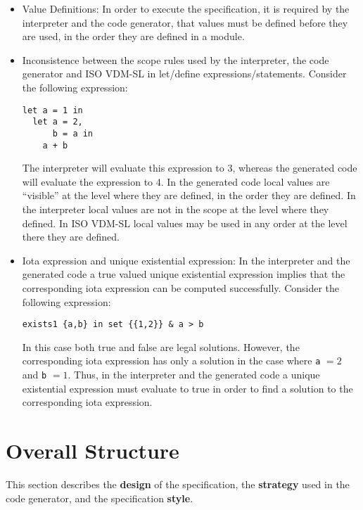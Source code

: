 \documentclass[a4paper,dvips]{article}
\begin{document}
\begin{itemize}
\item Value Definitions: In order to execute the specification, it is
  required by the interpreter and the code generator, that values must
  be defined before they are used, in the order they are defined in a
  module.

\item Inconsistence between the scope rules used by the interpreter,
  the code generator and ISO VDM-SL in let/define
  expressions/statements. Consider the following expression:

  \begin{verbatim}
let a = 1 in
  let a = 2,
      b = a in
    a + b
  \end{verbatim}

  The interpreter will evaluate this expression to 3, whereas the
  generated code will evaluate the expression to 4. In the
  generated code local values are ``visible'' at the level where they
  are defined, in the order they are defined. In the interpreter local
  values are not in the scope at the level where they defined. In ISO
  VDM-SL local values may be used in any order at the level there they
  are defined.

\item Iota expression and unique existential expression: In the
  interpreter and the generated code a true valued unique existential
  expression implies that the corresponding iota expression can be
  computed successfully. Consider the following expression:

  \begin{verbatim}
exists1 {a,b} in set {{1,2}} & a > b 
  \end{verbatim}

  In this case both {\sf true} and {\sf false} are legal solutions.
  However, the corresponding iota expression has only a solution in
  the case where {\tt a} $=2$ and {\tt b} $=1$. Thus, in the
  interpreter and the generated code a unique existential expression
  must evaluate to {\sf true} in order to find a solution to the
  corresponding iota expression.

\end{itemize}


\section{Overall Structure}

This section describes the {\bf design} of the specification, the {\bf
strategy} used in the code generator, and the specification {\bf style}.
\end{document}

